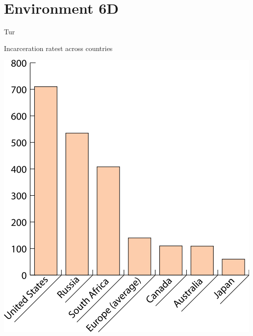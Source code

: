 
\section{Environment 6D}

\lipsum[1-4]

\begin{chart}{T}{ur}
\caption{Incarceration ratest across countries}
\label{chart:incarceration}
\includegraphics[width=\chartwidth,height=\chartheight]{incarceration}  
\end{chart}

